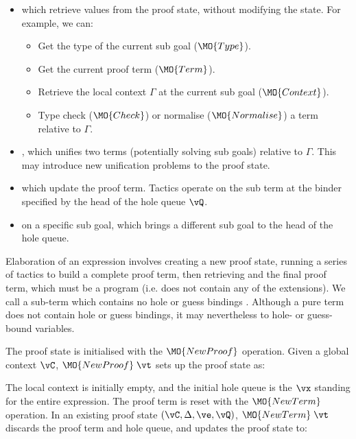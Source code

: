 \begin{itemize}
\item {} which retrieve values from the proof state, without modifying
the state. For example, we can:
\begin{itemize}
\item Get the type of the current sub goal ($\MO{Type}$).
\item Get the current proof term ($\MO{Term}$).
\item Retrieve the local context $\Gamma$ at the current sub goal
($\MO{Context}$).
\item Type check ($\MO{Check}$) or normalise ($\MO{Normalise}$) a term relative
to $\Gamma$.
\end{itemize}
\item {}, which unifies two terms (potentially solving sub
goals) relative to $\Gamma$. This may introduce new unification problems
to the proof state.
\item {} which update the proof term. Tactics operate on the sub term
at the binder specified by the head of the hole queue $\vQ$.
\item {} on a specific sub goal, which brings a different sub goal to the
head of the hole queue.
\end{itemize}

Elaboration of an \Idris{} expression involves creating a new proof state,
running a series of tactics to build a complete proof term, then retrieving and
 the final proof term, which must be a \TT{} program (i.e.
does not contain any of the \TTdev{} extensions). We call a sub-term which
contains no hole or guess bindings . Although a pure term does not
contain hole or guess bindings, it may nevertheless  to hole- or
guess-bound variables.

The proof state is initialised with the $\MO{NewProof}$ operation. Given a
global context $\vC$, $\MO{NewProof}\;\vt$ sets up the proof state as:

\DM{
(\vC, \cdot, \hole{\vx}{\vt}\SC\vx, \langle\rangle, \langle\vx\rangle)
}

The local context is initially empty, and the initial hole queue is the $\vx$ standing for
the entire expression. The proof term is reset with the $\MO{NewTerm}$ operation.
In an existing proof state $(\vC, \Delta, \ve, \vQ)$,
$\MO{NewTerm}\;\vt$ discards the proof term and hole queue, and
updates the proof state to:


